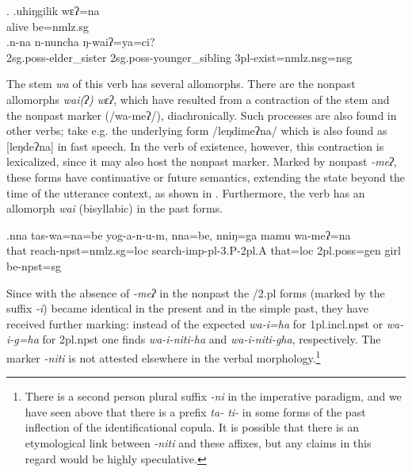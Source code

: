 \ex. \ag.uhiŋgilik wɛʔ=na\\
alive be{\sc [npst;3sg]=nmlz.sg}	\\ 
\bg.n-na n-nuncha ŋ-waiʔ=ya=ci?\\
{\sc 2sg.poss-}elder\_sister  {\sc 2sg.poss-}younger\_sibling {\sc 3pl-}exist{\sc [npst]=nmlz.nsg=nsg}\\


The stem \emph{wa} of this verb has several allomorphs. There are the nonpast allomorphs \emph{wai(ʔ) \ti wɛʔ}, which have resulted from a contraction of the stem and the nonpast marker (/wa-meʔ/), diachronically. Such processes are also found in other verbs; take e.g. the underlying form /leŋdimeʔna/ which is also found as [leŋdeʔna] in fast speech. In the verb of existence, however, this contraction is lexicalized, since it may also host the nonpast marker. Marked by nonpast \emph{-meʔ}, these forms have continuative or future semantics, extending the state beyond the time of the utterance context, as shown in \Next. Furthermore, the verb has an allomorph \emph{wai} (bisyllabic) in the past forms. 

\exg.nna  tas-wa=na=be                  yog-a-n-u-m,      nna=be,    nniŋ=ga       mamu wa-meʔ=na\\
that reach{\sc -npst=nmlz.sg=loc} search{\sc -imp-pl-3.P-2pl.A} that{\sc =loc} {\sc 2pl.poss=gen} girl be{\sc [3sg]-npst=sg}\\
 


Since with the absence of \emph{-meʔ} in the nonpast the {/2.pl} forms (marked by the suffix \emph{-i}) became identical in the present and in the simple past, they have received further marking: instead of the expected \emph{wa-i=ha} for {\sc 1pl.incl.npst} or \emph{wa-i-g=ha} for {\sc 2pl.npst} one finds \emph{wa-i-niti-ha} and \emph{wa-i-niti-gha}, respectively. The marker \emph{-niti} is not attested elsewhere in the verbal morphology.\footnote{There is a second person plural suffix \emph{-ni} in the imperative paradigm, and we have seen above that there is a prefix \emph{ta- \ti ti-} in some forms of the past inflection of the identificational copula. It is possible that there is an etymological link between \emph{-niti} and these affixes, but any claims in this regard would be highly speculative.}

